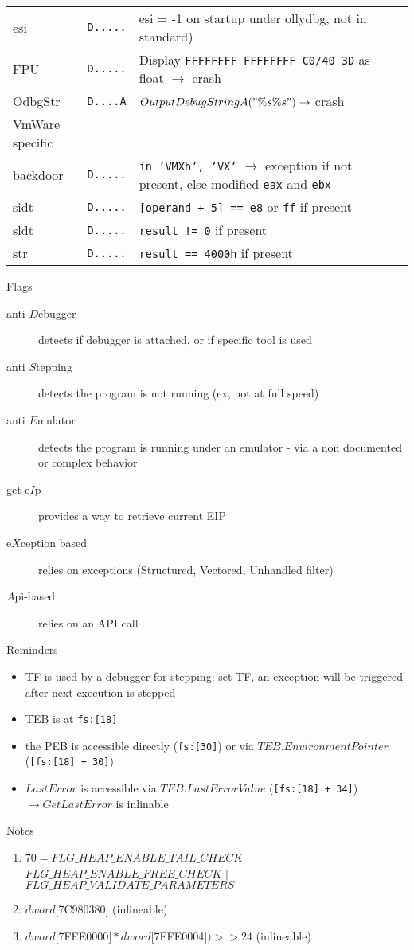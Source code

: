 \begin{tabular}{lllll}
\midrule
esi				& {\tt D.....} & esi = -1 on startup under ollydbg, not in standard) \\
FPU				& {\tt D.....} & Display {\tt FFFFFFFF FFFFFFFF C0/40 3D} as float $\rightarrow$ crash \\
OdbgStr			& {\tt D....A} & $OutputDebugStringA("\%s\%s") \rightarrow$ crash \\ 
\midrule
VmWare specific \\
\midrule
backdoor			& {\tt D.....} & {\tt in 'VMXh', 'VX'} $\rightarrow$ exception if not present, else modified {\tt eax} and {\tt ebx} \\
sidt				& {\tt D.....} & {\tt [operand + 5] == e8} or {\tt ff} if present \\
sldt				& {\tt D.....} & {\tt result != 0} if present \\
str				& {\tt D.....} & {\tt result == 4000h} if present \\
\bottomrule
\end{tabular}

\sig

\newpage

{\large Flags}
\begin{description}
\item[anti $D$ebugger]
detects if debugger is attached, or if specific tool is used
\item[anti $S$tepping]
detects the program is not running (ex, not at full speed)
\item[anti $E$mulator]
detects the program is running under an emulator - via a non documented or complex behavior
\item[get e$I$p]
provides a way to retrieve current EIP
\item[e$X$ception based]
relies on exceptions (Structured, Vectored, Unhandled filter)
\item[$A$pi-based]
relies on an API call
\end{description}


{\large Reminders}
\begin{itemize}
\item
TF is used by a debugger for stepping: set TF, an exception will be triggered after next execution is stepped
\item
TEB is at {\tt fs:[18]}
\item
the PEB is accessible directly ({\tt fs:[30]}) or via $TEB.EnvironmentPointer$ ({\tt [fs:[18] + 30]})
\item
$LastError$ is accessible via $TEB.LastErrorValue$ ({\tt [fs:[18] + 34]}) $\rightarrow GetLastError$ is inlinable
\end{itemize}
{\large Notes}
\begin{enumerate}
\item
$70 = ${\footnotesize $FLG\_HEAP\_ENABLE\_TAIL\_CHECK$} $|$ {\footnotesize $FLG\_HEAP\_ENABLE\_FREE\_CHECK$} $|$ {\footnotesize  $FLG\_HEAP\_VALIDATE\_PARAMETERS$}
\item
$dword[$7C980380$]$ (inlineable)
\item
$dword [$7FFE0000$] * dword[$7FFE0004$]) >> 24$ (inlineable)
\end{enumerate}
\sig

